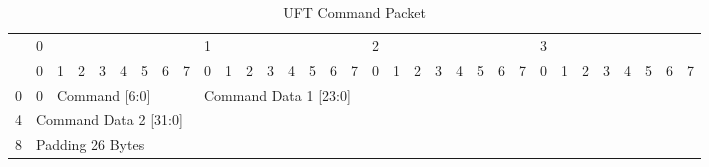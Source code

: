 \begin{table}[]
\centering
\begin{adjustbox}{max width=\textwidth}
\begin{tabular}{l|llllllll|llllllll|llllllll|llllllll|}
 & 0 &  &  &  &  &  &  &  & 1 &  &  &  &  &  &  &  & 2 &  &  &  &  &  &  &  & 3 &  &  &  &  &  &  &  \\
 & \multicolumn{1}{l|}{0} & \multicolumn{1}{l|}{1} & \multicolumn{1}{l|}{2} & \multicolumn{1}{l|}{3} & \multicolumn{1}{l|}{4} & \multicolumn{1}{l|}{5} & \multicolumn{1}{l|}{6} & 7 & \multicolumn{1}{l|}{0} & \multicolumn{1}{l|}{1} & \multicolumn{1}{l|}{2} & \multicolumn{1}{l|}{3} & \multicolumn{1}{l|}{4} & \multicolumn{1}{l|}{5} & \multicolumn{1}{l|}{6} & 7 & \multicolumn{1}{l|}{0} & \multicolumn{1}{l|}{1} & \multicolumn{1}{l|}{2} & \multicolumn{1}{l|}{3} & \multicolumn{1}{l|}{4} & \multicolumn{1}{l|}{5} & \multicolumn{1}{l|}{6} & 7 & \multicolumn{1}{l|}{0} & \multicolumn{1}{l|}{1} & \multicolumn{1}{l|}{2} & \multicolumn{1}{l|}{3} & \multicolumn{1}{l|}{4} & \multicolumn{1}{l|}{5} & \multicolumn{1}{l|}{6} & 7 \\ \hline
0 & \multicolumn{1}{l|}{0} & \multicolumn{7}{l|}{Command {[}6:0{]}} & \multicolumn{24}{l|}{Command Data 1 {[}23:0{]}} \\ \hline
4 & \multicolumn{32}{l|}{Command Data 2 {[}31:0{]}} \\ \hline
8 & \multicolumn{32}{l|}{Padding 26 Bytes} \\ \hline
\end{tabular}
\end{adjustbox}
\caption{UFT Command Packet}
\label{tab:uftcommand}
\end{table}

